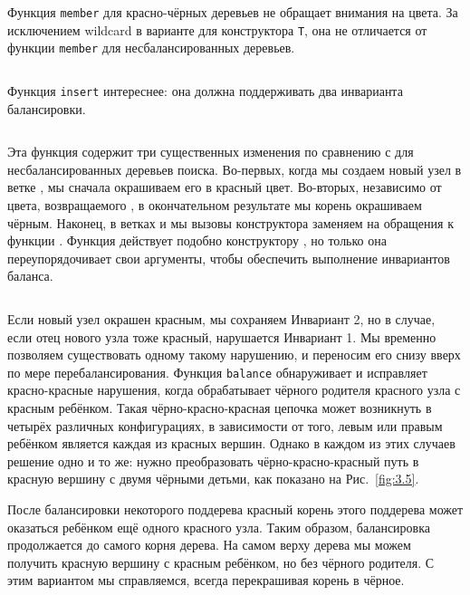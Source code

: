 \documentclass[aspectratio=169
  , xcolor={svgnames}
  , hyperref={ colorlinks,citecolor=DeepPink4
             , linkcolor=DarkRed,urlcolor=DarkBlue}
  , russian
  ]{beamer}
\theoremstyle{exerciseStyle1}
\begin{document}
\begin{frame}[fragile]{}
Функция \lstinline!member! для красно-чёрных деревьев не обращает
внимания на цвета. За исключением wildcard в варианте для конструктора
\lstinline!T!, она не отличается от функции \lstinline!member! для
несбалансированных деревьев.
\inputminted[firstline=18,lastline=21] {haskell}{code/RedBlackSet.lhs}
\end{frame}


\begin{frame}[fragile]{}
Функция \lstinline!insert! интереснее: она должна
поддерживать два инварианта балансировки.

\inputminted[firstline=23,lastline=29] {haskell}{code/RedBlackSet.lhs}

Эта функция содержит три существенных изменения по сравнению с  для
несбалансированных деревьев поиска. Во-первых, когда мы создаем новый
узел в ветке , мы сначала окрашиваем его в красный
цвет. Во-вторых, независимо от цвета, возвращаемого ,
в окончательном результате мы корень окрашиваем чёрным. Наконец, в
ветках  и  мы вызовы конструктора
 заменяем на обращения к функции
. Функция  действует подобно
конструктору , но только она переупорядочивает свои
аргументы, чтобы обеспечить выполнение инвариантов баланса.
\end{frame}


\begin{frame}[fragile]{}
\inputminted[firstline=9,lastline=13] {haskell}{code/RedBlackSet.lhs}

Если новый узел окрашен красным, мы сохраняем Инвариант 2, но в
случае, если отец нового узла тоже красный, нарушается Инвариант 1. Мы
временно позволяем существовать одному такому нарушению, и переносим
его снизу вверх по мере перебалансирования. Функция
\lstinline!balance! обнаруживает и исправляет красно-красные нарушения,
когда обрабатывает чёрного родителя красного узла с красным
ребёнком. Такая чёрно-красно-красная цепочка может возникнуть в
четырёх различных конфигурациях, в зависимости от того, левым или
правым ребёнком является каждая из красных вершин. Однако в каждом из
этих случаев решение одно и то же: нужно преобразовать
чёрно-красно-красный путь в красную вершину с двумя чёрными детьми,
как показано на Рис.~\ref{fig:3.5}.
\end{frame}


\begin{frame}[fragile]{}
После балансировки некоторого поддерева красный корень этого поддерева
может оказаться ребёнком ещё одного красного узла. Таким образом,
балансировка продолжается до самого корня дерева. На самом верху
дерева мы можем получить красную вершину с красным ребёнком, но без
чёрного родителя. С этим вариантом мы справляемся, всегда перекрашивая корень
в чёрное.

\end{frame}
\end{document}
